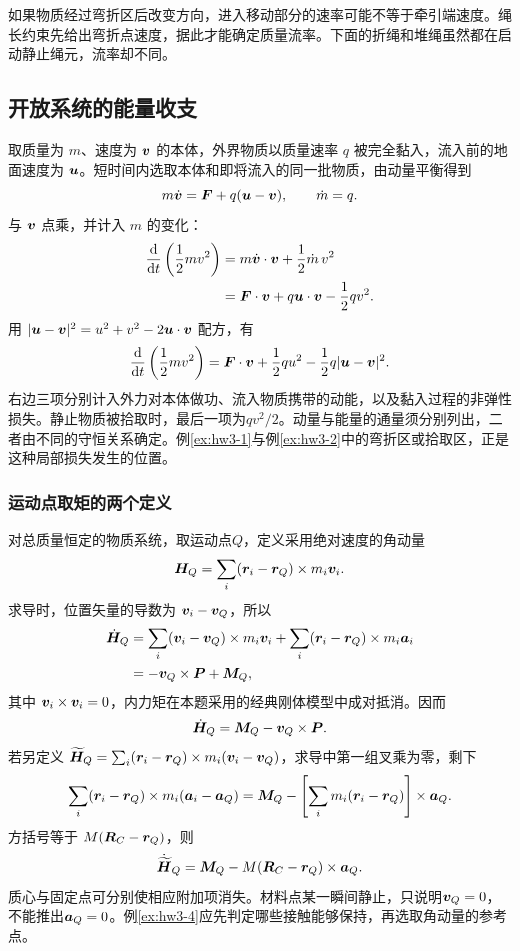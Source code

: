 如果物质经过弯折区后改变方向，进入移动部分的速率可能不等于牵引端速度。绳长约束先给出弯折点速度，据此才能确定质量流率。下面的折绳和堆绳虽然都在启动静止绳元，流率却不同。


\subsection{开放系统的能量收支}
\label{sec:complete3}
取质量为 $m$、速度为 $\bm{v}$ 的本体，外界物质以质量速率 $q$ 被完全黏入，流入前的地面速度为 $\bm{u}$。短时间内选取本体和即将流入的同一批物质，由动量平衡得到
\[
 m\dot{\bm{v}}=\bm{F}+q(\bm{u}-\bm{v}),\qquad \dot m=q.
\]
与 $\bm{v}$ 点乘，并计入 $m$ 的变化：
\[
\begin{aligned}
\frac{\mathop{}\!\mathrm d}{\mathop{}\!\mathrm d t}\left(\frac12mv^2\right)
&=m\dot{\bm{v}}\cdot\bm{v}+\frac12\dot m\,v^2\\
&=\bm{F}\cdot\bm{v}+q\bm{u}\cdot\bm{v}-\frac12qv^2.
\end{aligned}
\]
用 $|\bm{u}-\bm{v}|^2=u^2+v^2-2\bm{u}\cdot\bm{v}$ 配方，有
\[
 \frac{\mathop{}\!\mathrm d}{\mathop{}\!\mathrm d t}\left(\frac12mv^2\right)
 =\bm{F}\cdot\bm{v}+\frac12qu^2
   -\frac12q|\bm{u}-\bm{v}|^2.
\]
右边三项分别计入外力对本体做功、流入物质携带的动能，以及黏入过程的非弹性损失。静止物质被拾取时，最后一项为$qv^2/2$。动量与能量的通量须分别列出，二者由不同的守恒关系确定。例\ref{ex:hw3-1}与例\ref{ex:hw3-2}中的弯折区或拾取区，正是这种局部损失发生的位置。

\subsubsection{运动点取矩的两个定义}
对总质量恒定的物质系统，取运动点$Q$，定义采用绝对速度的角动量
\[
 \bm{H}_Q=\sum_i(\bm{r}_i-\bm{r}_Q)\times m_i\bm{v}_i.
\]
求导时，位置矢量的导数为 $\bm{v}_i-\bm{v}_Q$，所以
\[
\begin{aligned}
\dot{\bm{H}}_Q
&=\sum_i(\bm{v}_i-\bm{v}_Q)\times m_i\bm{v}_i
+\sum_i(\bm{r}_i-\bm{r}_Q)\times m_i\bm{a}_i\\
&=-\bm{v}_Q\times\bm{P}+\bm{M}_Q,
\end{aligned}
\]
其中 $\bm{v}_i\times\bm{v}_i=0$，内力矩在本题采用的经典刚体模型中成对抵消。因而
\[
 \dot{\bm{H}}_Q=\bm{M}_Q-\bm{v}_Q\times\bm{P}.
\]
若另定义 $\widetilde{\bm{H}}_Q=\sum_i(\bm{r}_i-\bm{r}_Q)\times m_i(\bm{v}_i-\bm{v}_Q)$，求导中第一组叉乘为零，剩下
\[
\sum_i(\bm{r}_i-\bm{r}_Q)\times m_i(\bm{a}_i-\bm{a}_Q)
=\bm{M}_Q-\left[\sum_i m_i(\bm{r}_i-\bm{r}_Q)\right]\times\bm{a}_Q.
\]
方括号等于 $M(\bm{R}_C-\bm{r}_Q)$，则
\[
 \dot{\widetilde{\bm{H}}}_Q
 =\bm{M}_Q-M(\bm{R}_C-\bm{r}_Q)\times\bm{a}_Q.
\]
质心与固定点可分别使相应附加项消失。材料点某一瞬间静止，只说明$\bm{v}_Q=0$，不能推出$\bm{a}_Q=0$。例\ref{ex:hw3-4}应先判定哪些接触能够保持，再选取角动量的参考点。


